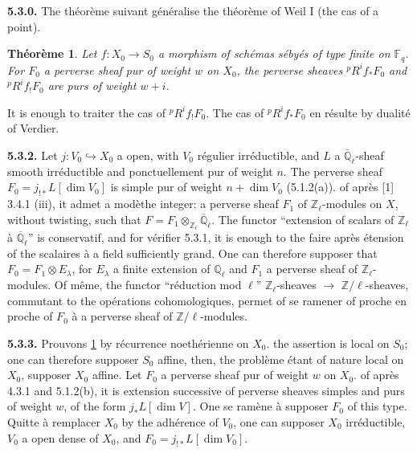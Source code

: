 \documentclass[12pt,a4paper]{article}
\theoremstyle{plain}
\newtheorem{theorem}{Th\'{e}or\`{e}me}[section]
\theoremstyle{definition}
\newcommand{\into}{\hookrightarrow}
\begin{document}
{{\noindent\textbf{5.3.0.} The th\'{e}or\`{e}me suivant g\'{e}n\'{e}ralise the th\'{e}or\`{e}me of Weil I (the cas of a point).

\begin{theorem}\label{thm:5.3.1}
Let $f: X_{0} \to S_{0}$ a morphism of sch\'{e}mas s\'{e}by\'{e}s of type finite on $\mathbb{F}_{q}$. For $F_{0}$ a perverse sheaf pur of weight $w$ on $X_{0}$, the perverse sheaves ${}^{p}R^{i}f_{*}F_{0}$ and ${}^{p}R^{i}f_{!}F_{0}$ are purs of weight $w+i$.
\end{theorem}

It is enough to traiter the cas of ${}^{p}R^{i}f_{!}F_{0}$. The cas of ${}^{p}R^{i}f_{*}F_{0}$ en r\'{e}sulte by dualit\'{e} of Verdier.

\noindent\textbf{5.3.2.} Let $j: V_{0} \into X_{0}$ a open, with $V_{0}$ r\'{e}gulier irr\'{e}ductible, and $L$ a $\overline{\mathbb{Q}}_{\ell}$-sheaf smooth irr\'{e}ductible and ponctuellement pur of weight $n$. The perverse sheaf $F_{0} = j_{!*}L[\dim V_{0}]$ is simple pur of weight $n + \dim V_{0}$ (5.1.2(a)). of apr\`{e}s [1] 3.4.1 (iii), it admet a mod\`{e}the integer: a perverse sheaf $F_{1}$ of $\mathbb{Z}_{\ell}$-modules on $X$, without twisting, such that $F = F_{1} \otimes_{\mathbb{Z}_{\ell}} \overline{\mathbb{Q}}_{\ell}$. The functor ``extension of scalars of $\mathbb{Z}_{\ell}$ \`{a} $\overline{\mathbb{Q}}_{\ell}$'' is conservatif, and for v\'{e}rifier 5.3.1, it is enough to the faire apr\`{e}s \'{e}tension of the scalaires \`{a} a field sufficiently grand. One can therefore supposer that $F_{0} = F_{1} \otimes E_{\lambda}$, for $E_{\lambda}$ a finite extension of $\mathbb{Q}_{\ell}$ and $F_{1}$ a perverse sheaf of $\mathbb{Z}_{\ell}$-modules. Of m\^{e}me, the functor ``r\'{e}duction mod $\ell$'' $\mathbb{Z}_{\ell}$-sheaves $\to$ $\mathbb{Z}/\ell$-sheaves, commutant to the op\'{e}rations cohomologiques, permet of se ramener of proche en proche of $F_{0}$ \`{a} a perverse sheaf of $\mathbb{Z}/\ell$-modules.

\noindent\textbf{5.3.3.} Prouvons \ref{thm:5.3.1} by r\'{e}currence noeth\'{e}rienne on $X_{0}$. the assertion is local on $S_{0}$; one can therefore supposer $S_{0}$ affine, then, the probl\`{e}me \'{e}tant of nature local on $X_{0}$, supposer $X_{0}$ affine. Let $F_{0}$ a perverse sheaf pur of weight $w$ on $X_{0}$. of apr\`{e}s 4.3.1 and 5.1.2(b), it is extension successive of perverse sheaves simples and purs of weight $w$, of the form $j_{*}L[\dim V]$. One se ram\`{e}ne \`{a} supposer $F_{0}$ of this type. Quitte \`{a} remplacer $X_{0}$ by the adh\'{e}rence of $V_{0}$, one can supposer $X_{0}$ irr\'{e}ductible, $V_{0}$ a open dense of $X_{0}$, and $F_{0} = j_{!*}L[\dim V_{0}]$.

}}
\end{document}
